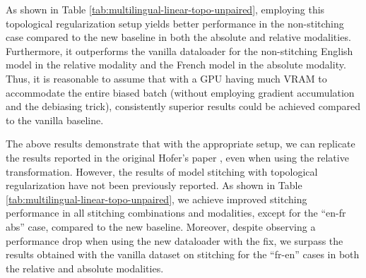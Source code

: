 \documentclass[../main.tex]{subfiles}
\begin{document}
As shown in Table \ref{tab:multilingual-linear-topo-unpaired}, employing this topological regularization setup yields better performance in the non-stitching case compared to the new baseline in both the absolute and relative modalities. Furthermore, it outperforms the vanilla dataloader for the non-stitching English model in the relative modality and the French model in the absolute modality. Thus, it is reasonable to assume that with a GPU having much VRAM to accommodate the entire biased batch (without employing gradient accumulation and the debiasing trick), consistently superior results could be achieved compared to the vanilla baseline.\\

\begin{table}[ht!]
\centering
{}
\caption{Topological regularization (over two random seeds)}
\label{tab:multilingual-linear-topo-unpaired}
\end{table}

The above results demonstrate that with the appropriate setup, we can replicate the results reported in the original Hofer's paper \cite{hofer_densified_2021}, even when using the relative transformation. However, the results of model stitching with topological regularization have not been previously reported. As shown in Table \ref{tab:multilingual-linear-topo-unpaired}, we achieve improved stitching performance in all stitching combinations and modalities, except for the ``en-fr abs'' case, compared to the new baseline. Moreover, despite observing a performance drop when using the new dataloader with the fix, we surpass the results obtained with the vanilla dataset on stitching for the ``fr-en'' cases in both the relative and absolute modalities.\\
\end{document}

